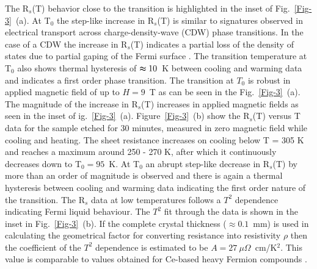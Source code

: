 \documentclass[aps,prb,twocolumn]{revtex4-1}
\begin{document}
The R$_{s}$(T) behavior close to the transition is highlighted in the inset of Fig.~\ref{Fig-3}~(a).  At T$ _{0}$ the step-like increase in R$_{s}$(T) is similar to signatures observed in electrical transport across charge-density-wave (CDW) phase transitions. In the case of a CDW the increase in R$_{s}$(T) indicates a partial loss of the density of states due to partial gaping of the Fermi surface \cite{Gruener2000}.  The transition temperature at T$ _{0} $ also shows thermal hysteresis of $ \thickapprox 10$~K between cooling and warming data and indicates a first order phase transition. The transition at $T_0$ is robust in applied magnetic field of up to $H = 9$~T as can be seen in the Fig.~\ref{Fig-3}~(a).  The magnitude of the increase in R$_{s}$(T) increases in applied magnetic fields as seen in the inset of ig.~\ref{Fig-3}~(a). Figure~\ref{Fig-3}~(b) show the R$_{s}$(T) versus T data for the sample etched for 30 minutes, measured in zero magnetic field while cooling and heating.  The sheet resistance increases on cooling below T = 305 K and reaches a maximum around 250 - 270 K, after which it continuously decreases down to T$ _{0} = 95$~K\@.  At T$ _{0} $ an abrupt step-like decrease in R$_{s}$(T) by more than an order of magnitude is observed and there is again a thermal hysteresis between cooling and warming data indicating the first order nature of the transition. The R$_{s}$ data at low temperatures follows a $T^2$ dependence indicating Fermi liquid behaviour.  The $T^2$ fit through the data is shown in the inset in Fig.~\ref{Fig-3}~(b).  If the complete crystal thickness ($\approx 0.1$~mm) is used in calculating the geometrical factor for converting resistance into resistivity $\rho$ then the coefficient of the $T^2$ dependence is estimated to be $A = 27~\mu \Omega$~cm/K$^2$.  This value is comparable to values obtained for Ce-based heavy Fermion compounds \cite{Stewart-RMP}.  
\end{document}
